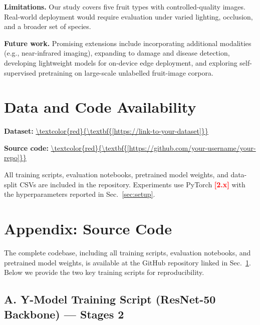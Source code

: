 \documentclass[10pt,twocolumn,letterpaper]{article}
\newcommand{\placeholder}[1]{\textcolor{red}{\textbf{[#1]}}}
\begin{document}
\textbf{Limitations.}
Our study covers five fruit types with controlled-quality images.
Real-world deployment would require evaluation under varied lighting, occlusion, and a broader set of species.

\textbf{Future work.}
Promising extensions include incorporating additional modalities (e.g., near-infrared imaging), expanding to damage and disease detection, developing lightweight models for on-device edge deployment, and exploring self-supervised pretraining on large-scale unlabelled fruit-image corpora.

\section{Data and Code Availability}
\label{sec:availability}

\textbf{Dataset:} \url{\placeholder{https://link-to-your-dataset}}

\textbf{Source code:} \url{\placeholder{https://github.com/your-username/your-repo}}

\noindent All training scripts, evaluation notebooks, pretrained model weights, and data-split CSVs are included in the repository.
Experiments use PyTorch \placeholder{2.x} with the hyperparameters reported in Sec.~\ref{sec:setup}.

\clearpage
\onecolumn
\appendix
\section*{Appendix: Source Code}
\label{sec:appendix}

The complete codebase, including all training scripts, evaluation notebooks, and pretrained model weights, is available at the GitHub repository linked in Sec.~\ref{sec:availability}.
Below we provide the two key training scripts for reproducibility.

\subsection*{A. Y-Model Training Script (ResNet-50 Backbone) — Stages 2}
\end{document}
